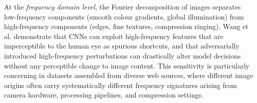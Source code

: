 
At the \emph{frequency domain level}, the Fourier decomposition of images separates
low-frequency components (smooth colour gradients, global illumination) from high-frequency
components (edges, fine textures, compression ringing).  Wang et al. \cite{Wang_2020_HighFrequencyComponentHelpsExplainTheGeneralizationOfCNN}
demonstrate that CNNs can exploit high-frequency features that are imperceptible to the human
eye as spurious shortcuts, and that adversarially introduced high-frequency perturbations can
drastically alter model decisions without any perceptible change to image content.  This
sensitivity is particularly concerning in datasets assembled from diverse web sources,
where different image origins often carry systematically different frequency signatures
arising from camera hardware, processing pipelines, and compression settings.

